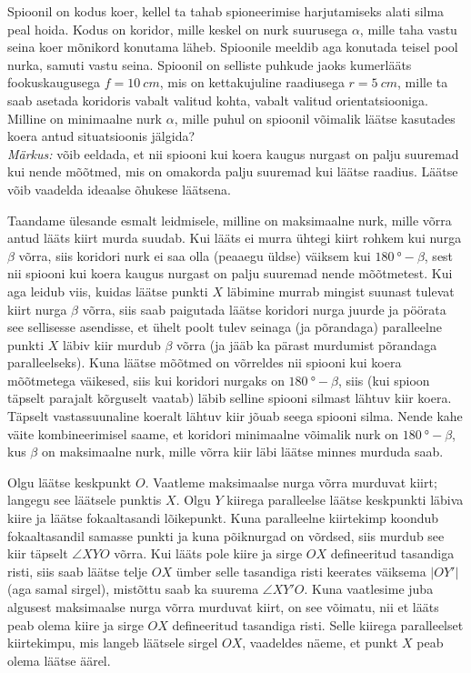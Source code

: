 
Spioonil on kodus koer, kellel ta tahab spioneerimise harjutamiseks alati silma peal hoida. Kodus on koridor, mille keskel on nurk suurusega $\alpha$, mille taha vastu seina koer mõnikord konutama läheb. Spioonile meeldib aga konutada teisel pool nurka, samuti vastu seina. Spioonil on selliste puhkude jaoks kumerlääts fookuskaugusega $f=\SI{10}{cm}$, mis on kettakujuline raadiusega $r=\SI{5}{cm}$, mille ta saab asetada koridoris vabalt valitud kohta, vabalt valitud orientatsiooniga. Milline on minimaalne nurk $\alpha$, mille puhul on spioonil võimalik läätse kasutades koera antud situatsioonis jälgida?\\
\emph{Märkus:} võib eeldada, et nii spiooni kui koera kaugus nurgast on palju suuremad kui nende mõõtmed, mis on omakorda palju suuremad kui läätse raadius. Läätse võib vaadelda ideaalse õhukese läätsena.


\hint

\solu
Taandame ülesande esmalt leidmisele, milline on maksimaalne nurk, mille võrra antud lääts kiirt murda suudab. Kui lääts ei murra ühtegi kiirt rohkem kui nurga $\beta$ võrra, siis koridori nurk ei saa olla (peaaegu üldse) väiksem kui $\SI{180}{\degree} - \beta$, sest nii spiooni kui koera kaugus nurgast on palju suuremad nende mõõtmetest. Kui aga leidub viis, kuidas läätse punkti $X$ läbimine murrab mingist suunast tulevat kiirt nurga $\beta$ võrra, siis saab paigutada läätse koridori nurga juurde ja pöörata see sellisesse asendisse, et ühelt poolt tulev seinaga (ja põrandaga) paralleelne punkti $X$ läbiv kiir murdub $\beta$ võrra (ja jääb ka pärast murdumist põrandaga paralleelseks). Kuna läätse mõõtmed on võrreldes nii spiooni kui koera mõõtmetega väikesed, siis kui koridori nurgaks on $\SI{180}{\degree} - \beta$, siis (kui spioon täpselt parajalt kõrguselt vaatab) läbib selline spiooni silmast lähtuv kiir koera. Täpselt vastassuunaline koeralt lähtuv kiir jõuab seega spiooni silma. Nende kahe väite kombineerimisel saame, et koridori minimaalne võimalik nurk on $\SI{180}{\degree}-\beta$, kus $\beta$ on maksimaalne nurk, mille võrra kiir läbi läätse minnes murduda saab. 

Olgu läätse keskpunkt $O$. Vaatleme maksimaalse nurga võrra murduvat kiirt; langegu see läätsele punktis $X$. Olgu $Y$ kiirega paralleelse läätse keskpunkti läbiva kiire ja läätse fokaaltasandi lõikepunkt. Kuna paralleelne kiirtekimp koondub fokaaltasandil samasse punkti ja kuna põiknurgad on võrdsed, siis murdub see kiir täpselt $\angle XYO$ võrra. Kui lääts pole kiire ja sirge $OX$ defineeritud tasandiga risti, siis saab läätse telje $OX$ ümber selle tasandiga risti keerates väiksema $|OY'|$ (aga samal sirgel), mistõttu saab ka suurema $\angle XY'O$. Kuna vaatlesime juba algusest maksimaalse nurga võrra murduvat kiirt, on see võimatu, nii et lääts peab olema kiire ja sirge $OX$ defineeritud tasandiga risti. Selle kiirega paralleelset kiirtekimpu, mis langeb läätsele sirgel $OX$, vaadeldes näeme, et punkt $X$ peab olema läätse äärel. 

